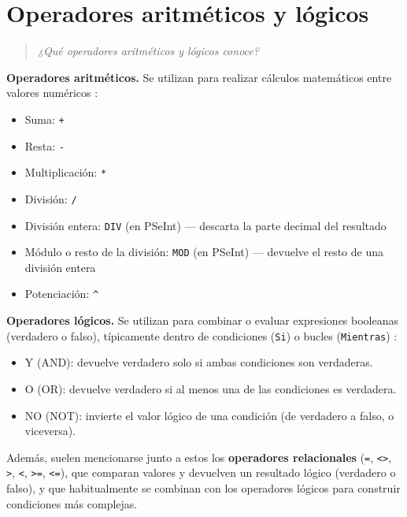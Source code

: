 \documentclass[12pt]{article}
\newcommand{\enunciado}[1]{%
    \begin{quote}
        \itshape #1
    \end{quote}
}
\begin{document}

\section{Operadores aritméticos y lógicos}

\enunciado{¿Qué operadores aritméticos y lógicos conoce?}

\textbf{Operadores aritméticos.} Se utilizan para realizar cálculos matemáticos entre valores numéricos \parencite{joyanes2008fundamentos}:

\begin{itemize}[noitemsep]
    \item Suma: \texttt{+}
    \item Resta: \texttt{-}
    \item Multiplicación: \texttt{*}
    \item División: \texttt{/}
    \item División entera: \texttt{DIV} (en PSeInt) — descarta la parte decimal del resultado
    \item Módulo o resto de la división: \texttt{MOD} (en PSeInt) — devuelve el resto de una división entera
    \item Potenciación: \texttt{\textasciicircum}
\end{itemize}

\textbf{Operadores lógicos.} Se utilizan para combinar o evaluar expresiones booleanas (verdadero o falso), típicamente dentro de condiciones (\texttt{Si}) o bucles (\texttt{Mientras}) \parencite{cairo2005metodologia}:

\begin{itemize}[noitemsep]
    \item Y (AND): devuelve verdadero solo si ambas condiciones son verdaderas.
    \item O (OR): devuelve verdadero si al menos una de las condiciones es verdadera.
    \item NO (NOT): invierte el valor lógico de una condición (de verdadero a falso, o viceversa).
\end{itemize}

Además, suelen mencionarse junto a estos los \textbf{operadores relacionales} (\texttt{=}, \texttt{<>}, \texttt{>}, \texttt{<}, \texttt{>=}, \texttt{<=}), que comparan valores y devuelven un resultado lógico (verdadero o falso), y que habitualmente se combinan con los operadores lógicos para construir condiciones más complejas.
\end{document}
